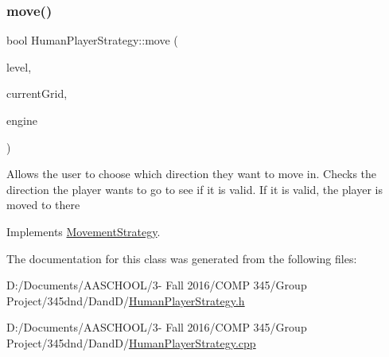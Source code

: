 \hypertarget{class_human_player_strategy_a13ea61ac71164220e3f01b0c5459acfe}{}\label{class_human_player_strategy_a13ea61ac71164220e3f01b0c5459acfe} 
\subsubsection{\texorpdfstring{move()}{move()}\hspace{0.1cm}{\footnotesize\ttfamily [2/2]}}
{\footnotesize\ttfamily bool Human\+Player\+Strategy\+::move (\begin{DoxyParamCaption}\item[{\hyperlink{class_pre_built_level}{Pre\+Built\+Level} $\ast$}]{level,  }\item[{S\+D\+L\+\_\+\+Rect $\ast$}]{current\+Grid,  }\item[{\hyperlink{class_game_play_engine}{Game\+Play\+Engine} $\ast$}]{engine }\end{DoxyParamCaption})\hspace{0.3cm}{\ttfamily [virtual]}}

Allows the user to choose which direction they want to move in. Checks the direction the player wants to go to see if it is valid. If it is valid, the player is moved to there 

Implements \hyperlink{class_movement_strategy}{Movement\+Strategy}.



The documentation for this class was generated from the following files\+:\begin{DoxyCompactItemize}
\item 
D\+:/\+Documents/\+A\+A\+S\+C\+H\+O\+O\+L/3-\/ Fall 2016/\+C\+O\+M\+P 345/\+Group Project/345dnd/\+Dand\+D/\hyperlink{_human_player_strategy_8h}{Human\+Player\+Strategy.\+h}\item 
D\+:/\+Documents/\+A\+A\+S\+C\+H\+O\+O\+L/3-\/ Fall 2016/\+C\+O\+M\+P 345/\+Group Project/345dnd/\+Dand\+D/\hyperlink{_human_player_strategy_8cpp}{Human\+Player\+Strategy.\+cpp}\end{DoxyCompactItemize}
